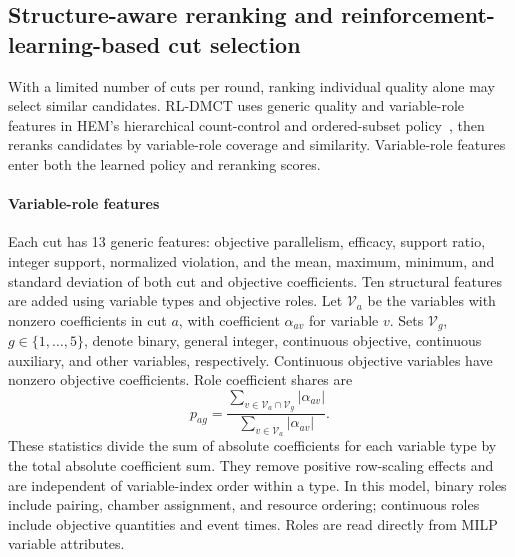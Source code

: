 \documentclass[final,5p,times,twocolumn]{elsarticle}
\begin{document}
\subsection{Structure-aware reranking and reinforcement-learning-based cut selection}
\label{sec:hem-extension-cn}
With a limited number of cuts per round, ranking individual quality alone may select similar candidates. RL-DMCT uses generic quality and variable-role features in HEM's hierarchical count-control and ordered-subset policy~\citep{wang2023hem}, then reranks candidates by variable-role coverage and similarity. Variable-role features enter both the learned policy and reranking scores.

\paragraph{Variable-role features}
Each cut has 13 generic features: objective parallelism, efficacy, support ratio, integer support, normalized violation, and the mean, maximum, minimum, and standard deviation of both cut and objective coefficients. Ten structural features are added using variable types and objective roles. Let $\mathcal V_a$ be the variables with nonzero coefficients in cut $a$, with coefficient $\alpha_{av}$ for variable $v$. Sets $\mathcal V_g$, $g\in\{1,\ldots,5\}$, denote binary, general integer, continuous objective, continuous auxiliary, and other variables, respectively. Continuous objective variables have nonzero objective coefficients. Role coefficient shares are
\begin{equation}
p_{ag}=\frac{\sum_{v\in\mathcal V_a\cap\mathcal V_g}|\alpha_{av}|}
{\sum_{v\in\mathcal V_a}|\alpha_{av}|}.
\label{eq:role-profile-cn}
\end{equation}
These statistics divide the sum of absolute coefficients for each variable type by the total absolute coefficient sum. They remove positive row-scaling effects and are independent of variable-index order within a type. In this model, binary roles include pairing, chamber assignment, and resource ordering; continuous roles include objective quantities and event times. Roles are read directly from MILP variable attributes.
\end{document}
